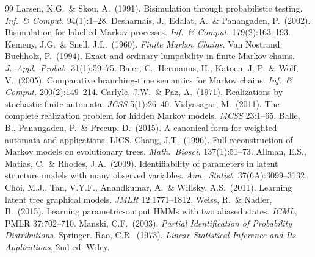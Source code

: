 \documentclass[11pt]{article}
\begin{document}
\begin{thebibliography}{99}\small
{} Larsen, K.G.\ \& Skou, A.\ (1991). Bisimulation through probabilistic testing. \emph{Inf.\ \&
Comput.} 94(1):1--28.
 Desharnais, J., Edalat, A.\ \& Panangaden, P.\ (2002). Bisimulation for labelled Markov processes.
\emph{Inf.\ \& Comput.} 179(2):163--193.
 Kemeny, J.G.\ \& Snell, J.L.\ (1960). \emph{Finite Markov Chains}. Van Nostrand.
 Buchholz, P.\ (1994). Exact and ordinary lumpability in finite Markov chains. \emph{J.\ Appl.\
Probab.} 31(1):59--75.
 Baier, C., Hermanns, H., Katoen, J.-P.\ \& Wolf, V.\ (2005). Comparative branching-time
semantics for Markov chains. \emph{Inf.\ \& Comput.} 200(2):149--214.
\bibitem{cp71} Carlyle, J.W.\ \& Paz, A.\ (1971). Realizations by stochastic finite automata. \emph{JCSS}
5(1):26--40.
 Vidyasagar, M.\ (2011). The complete realization problem for hidden Markov models. \emph{MCSS}
23:1--65.
 Balle, B., Panangaden, P.\ \& Precup, D.\ (2015). A canonical form for weighted automata and
applications. LICS.
 Chang, J.T.\ (1996). Full reconstruction of Markov models on evolutionary trees. \emph{Math.\
Biosci.} 137(1):51--73.
\bibitem{amr09} Allman, E.S., Matias, C.\ \& Rhodes, J.A.\ (2009). Identifiability of parameters in latent
structure models with many observed variables. \emph{Ann.\ Statist.} 37(6A):3099--3132.
\bibitem{choi11} Choi, M.J., Tan, V.Y.F., Anandkumar, A.\ \& Willsky, A.S.\ (2011). Learning latent tree
graphical models. \emph{JMLR} 12:1771--1812.
\bibitem{wn15} Weiss, R.\ \& Nadler, B.\ (2015). Learning parametric-output HMMs with two aliased states.
\emph{ICML}, PMLR 37:702--710.
\bibitem{manski03} Manski, C.F.\ (2003). \emph{Partial Identification of Probability Distributions}. Springer.
\bibitem{rao73} Rao, C.R.\ (1973). \emph{Linear Statistical Inference and Its Applications}, 2nd ed. Wiley.
\end{thebibliography}
\end{document}
